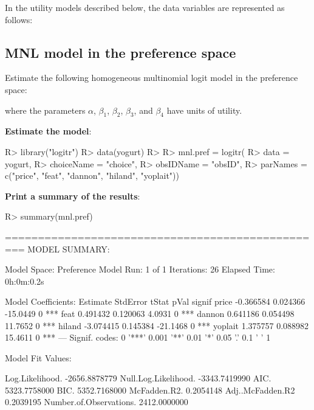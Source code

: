 \documentclass[article]{jss}
\begin{document}
In the utility models described below, the data variables are
represented as follows:



\hypertarget{mnl-model-in-the-preference-space}{%
\subsection{MNL model in the preference
space}\label{mnl-model-in-the-preference-space}}

Estimate the following homogeneous multinomial logit model in the
preference space:



where the parameters \(\alpha\), \(\beta_1\), \(\beta_2\), \(\beta_3\),
and \(\beta_4\) have units of utility.

\textbf{Estimate the model}:

\begin{CodeChunk}

\begin{CodeInput}
R> library("logitr")
R> data(yogurt)
R> 
R> mnl.pref = logitr(
R>     data       = yogurt,
R>     choiceName = "choice",
R>     obsIDName  = "obsID",
R>     parNames   = c("price", "feat", "dannon", "hiland", "yoplait"))
\end{CodeInput}
\end{CodeChunk}

\textbf{Print a summary of the results}:

\begin{CodeChunk}

\begin{CodeInput}
R> summary(mnl.pref)
\end{CodeInput}

\begin{CodeOutput}
=================================================
MODEL SUMMARY: 
                        
Model Space:  Preference
Model Run:        1 of 1
Iterations:           26
Elapsed Time: 0h:0m:0.2s

Model Coefficients: 
         Estimate StdError    tStat pVal signif
price   -0.366584 0.024366 -15.0449    0    ***
feat     0.491432 0.120063   4.0931    0    ***
dannon   0.641186 0.054498  11.7652    0    ***
hiland  -3.074415 0.145384 -21.1468    0    ***
yoplait  1.375757 0.088982  15.4611    0    ***
---
Signif. codes:  0 '***' 0.001 '**' 0.01 '*' 0.05 '.' 0.1 ' ' 1

Model Fit Values: 
                                     
Log.Likelihood.         -2656.8878779
Null.Log.Likelihood.    -3343.7419990
AIC.                     5323.7758000
BIC.                     5352.7168000
McFadden.R2.                0.2054148
Adj..McFadden.R2            0.2039195
Number.of.Observations.  2412.0000000
\end{CodeOutput}
\end{CodeChunk}
\end{document}
